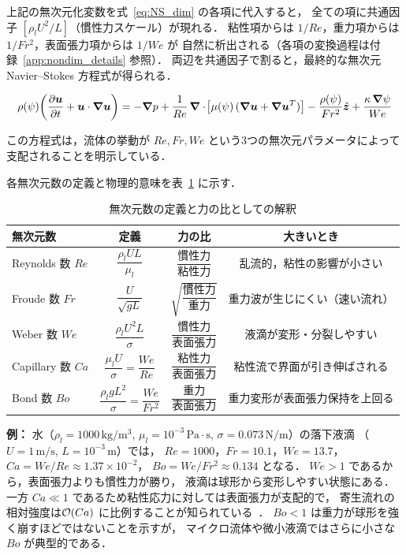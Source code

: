 上記の無次元化変数を式~\eqref{eq:NS_dim} の各項に代入すると，
全ての項に共通因子 $[\rho_l U^2/L]$（慣性力スケール）が現れる．
粘性項からは $1/Re$，重力項からは $1/Fr^2$，表面張力項からは $1/We$ が
自然に析出される（各項の変換過程は付録~\ref{app:nondim_details} 参照）．
両辺を共通因子で割ると，最終的な無次元 Navier--Stokes 方程式が得られる．

\begin{equation}
 \rho(\psi)\!\left(\dfrac{\partial \bm{u}}{\partial t}+\bm{u}\cdot\bm{\nabla}\bm{u}\right)
 =-\bm{\nabla} p+\frac{1}{Re}\,\bm{\nabla}\cdot\!\left[\mu(\psi)\,(\bm{\nabla}\bm{u}+\bm{\nabla}\bm{u}^T)\right]
 -\frac{\rho(\psi)}{Fr^2}\hat{\bm z}+\frac{\kappa\,\bm{\nabla}\psi}{We}
 \label{eq:NS_dimless_cls}
\end{equation}

この方程式は，流体の挙動が $Re, Fr, We$ という3つの無次元パラメータによって
支配されることを明示している．

各無次元数の定義と物理的意味を表~\ref{tab:dimless_numbers} に示す．

\begin{table}[htbp]
\centering
\renewcommand{\arraystretch}{\PaperTableArrayStretch}
\begin{tabular}{lccc}
\hline
無次元数      & 定義 & 力の比 & 大きいとき \\
\hline
Reynolds 数 $Re$ & $\dfrac{\rho_l U L}{\mu_l}$
  & $\dfrac{\text{慣性力}}{\text{粘性力}}$
  & 乱流的，粘性の影響が小さい \\[6pt]
Froude 数 $Fr$   & $\dfrac{U}{\sqrt{gL}}$
  & $\sqrt{\dfrac{\text{慣性力}}{\text{重力}}}$
  & 重力波が生じにくい（速い流れ） \\[6pt]
Weber 数 $We$    & $\dfrac{\rho_l U^2 L}{\sigma}$
  & $\dfrac{\text{慣性力}}{\text{表面張力}}$
  & 液滴が変形・分裂しやすい \\[6pt]
Capillary 数 $Ca$ & $\dfrac{\mu_l U}{\sigma} = \dfrac{We}{Re}$
  & $\dfrac{\text{粘性力}}{\text{表面張力}}$
  & 粘性流で界面が引き伸ばされる \\[6pt]
Bond 数 $Bo$     & $\dfrac{\rho_l g L^2}{\sigma} = \dfrac{We}{Fr^2}$
  & $\dfrac{\text{重力}}{\text{表面張力}}$
  & 重力変形が表面張力保持を上回る \\
\hline
\end{tabular}
\caption{無次元数の定義と力の比としての解釈}
\label{tab:dimless_numbers}
\end{table}

\noindent\textbf{例：}
水（$\rho_l=1000\,\mathrm{kg/m^3}$,
$\mu_l=10^{-3}\,\mathrm{Pa\cdot s}$,
$\sigma=0.073\,\mathrm{N/m}$）の落下液滴
（$U=1\,\mathrm{m/s}$, $L=10^{-3}\,\mathrm{m}$）では，
$Re=1000$，$Fr=10.1$，$We=13.7$，
$Ca = We/Re \approx 1.37\times 10^{-2}$，
$Bo = We/Fr^2 \approx 0.134$ となる．
$We > 1$ であるから，表面張力よりも慣性力が勝り，
液滴は球形から変形しやすい状態にある．
一方 $Ca \ll 1$ であるため粘性応力に対しては表面張力が支配的で，
寄生流れの相対強度は$\mathcal{O}(Ca)$ に比例することが知られている~\cite{Popinet2009}．
$Bo < 1$ は重力が球形を強く崩すほどではないことを示すが，
マイクロ流体や微小液滴ではさらに小さな $Bo$ が典型的である．

